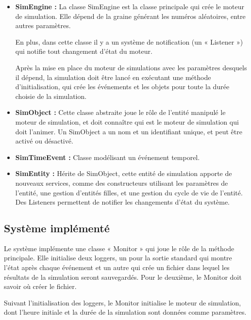 \documentclass[12pt]{article} %
\begin{document}
\begin{itemize}
\item \textbf{SimEngine :}
La classe SimEngine est la classe principale qui crée le moteur de simulation. Elle dépend de la graine générant les numéros aléatoires, entre autres paramètres.

En plus, dans cette classe il y a un système de notification (un « Listener ») qui notifie tout changement d'état du moteur. 

Après la mise en place du moteur de simulations avec les paramètres desquels il dépend, la simulation doit être lancé en exécutant une méthode d'initialisation, qui crée les événements et les objets pour toute la durée choisie de la simulation. 

\item \textbf{SimObject :} Cette classe abstraite joue le rôle de l’entité manipulé le moteur de simulation, et doit connaître qui est le moteur de simulation qui doit l'animer.
Un SimObject a un nom et un identifiant unique, et peut être activé ou désactivé.

\item \textbf{SimTimeEvent :} Classe modélisant un événement temporel.

\item \textbf{SimEntity :} Hérite de SimObject, cette entité de simulation apporte de nouveaux services, comme des constructeurs utilisant les paramètres de l’entité, une gestion d’entités filles, et une gestion du cycle de vie de l’entité. Des Listeners permettent de notifier les changements d’état du système.

\end{itemize}

\subsection{Système implémenté}
Le système implémente une classe « Monitor » qui joue le rôle de la méthode principale. Elle initialise deux loggers, un pour la sortie standard qui montre l'état après chaque événement et un autre qui crée un fichier dans lequel les résultats de la simulation seront sauvegardés. Pour le deuxième, le Monitor doit savoir où créer le fichier.

Suivant l'initialisation des loggers, le Monitor initialise le moteur de simulation, dont l'heure initiale et la durée de la simulation sont données comme paramètres. 
\end{document}
